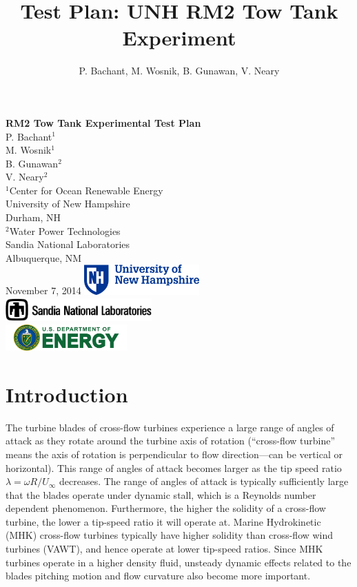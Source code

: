 \documentclass[12pt]{report}
\author{P. Bachant, M. Wosnik, B. Gunawan, V. Neary}
\title{Test Plan: UNH RM2 Tow Tank Experiment}
\begin{document}
\begin{titlepage}
    \centering
    \vfill
    {\bfseries\Large
        RM2 Tow Tank Experimental Test Plan\\
    }  
            \vskip2cm
            P. Bachant$^1$\\
            M. Wosnik$^1$\\
            B. Gunawan$^2$\\
            V. Neary$^2$\\  
    \vfill
    $^1$Center for Ocean Renewable Energy \\
    University of New Hampshire \\
    Durham, NH \\
    \vspace{0.1in}
    $^2$Water Power Technologies \\
    Sandia National Laboratories \\
    Albuquerque, NM \\
    \vfill
    November 7, 2014
    \vfill
    \includegraphics[width=0.33\textwidth]{Figures/unhlogo} \\
    \vspace{0.1in}
    \includegraphics[width=0.42\textwidth]{Figures/snllogo} \\
    \vspace{0.1in}
    \includegraphics[width=0.35\textwidth]{Figures/doelogo}
\end{titlepage}

\tableofcontents

\chapter{Introduction}

The turbine blades of cross-flow turbines experience a large range of angles of
attack as they rotate around the turbine axis of rotation (``cross-flow
turbine'' means the axis of rotation is perpendicular to flow direction---can be
vertical or horizontal).  This range of angles of attack becomes larger as the
tip speed ratio $\lambda=\omega R/U_\infty$  decreases.  The range of angles of
attack is typically sufficiently large that the blades operate under dynamic
stall, which is a Reynolds number dependent phenomenon. Furthermore, the higher
the solidity of a cross-flow turbine, the lower a tip-speed ratio it will
operate at. Marine Hydrokinetic (MHK) cross-flow turbines typically have higher
solidity than cross-flow wind turbines (VAWT), and hence operate at lower
tip-speed ratios. Since MHK turbines operate in a higher density fluid, unsteady
dynamic effects related to the blades pitching motion and flow curvature also
become more important.
\end{document}
